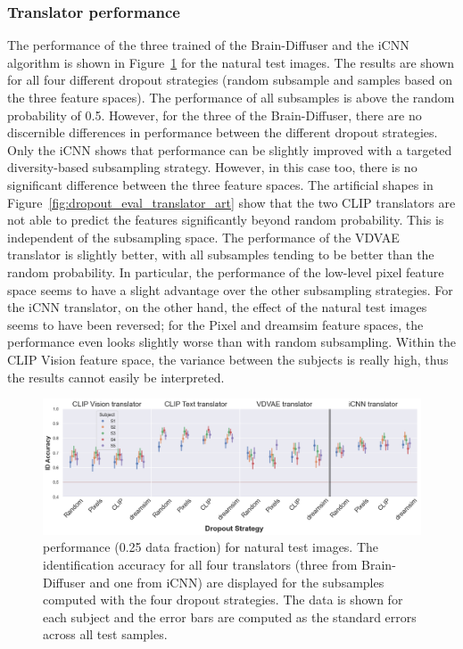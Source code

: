 \subsubsection{Translator performance}
The performance of the three trained  of the Brain-Diffuser and the iCNN algorithm is shown in Figure~\ref{fig:dropout_eval_translator_test} for the natural test images. The results are shown for all four different dropout strategies (random subsample and samples based on the three feature spaces). The performance of all subsamples is above the random probability of 0.5. However, for the three  of the Brain-Diffuser, there are no discernible differences in performance between the different dropout strategies. Only the iCNN  shows that performance can be slightly improved with a targeted diversity-based subsampling strategy. However, in this case too, there is no significant difference between the three feature spaces. The artificial shapes in Figure~\ref{fig:dropout_eval_translator_art} show that the two CLIP translators are not able to predict the features significantly beyond random probability. This is independent of the subsampling space. The performance of the VDVAE translator is slightly better, with all subsamples tending to be better than the random probability. In particular, the performance of the low-level pixel feature space seems to have a slight advantage over the other subsampling strategies. For the iCNN translator, on the other hand, the effect of the natural test images seems to have been reversed; for the Pixel and dreamsim feature spaces, the performance even looks slightly worse than with random subsampling. Within the CLIP Vision feature space, the variance between the subjects is really high, thus the results cannot easily be interpreted.

\begin{figure}[ht]
  \centering
  \includegraphics[width=1\textwidth]{plots/dropout_eval_translator_test.png}
  \caption[Experiment 1: Translator performance for natural test images]{ performance (0.25 data fraction) for natural test images. The identification accuracy for all four translators (three from Brain-Diffuser and one from iCNN) are displayed for the subsamples computed with the four dropout strategies. The data is shown for each subject and the error bars are computed as the standard errors across all test samples.}\label{fig:dropout_eval_translator_test}
\end{figure}


